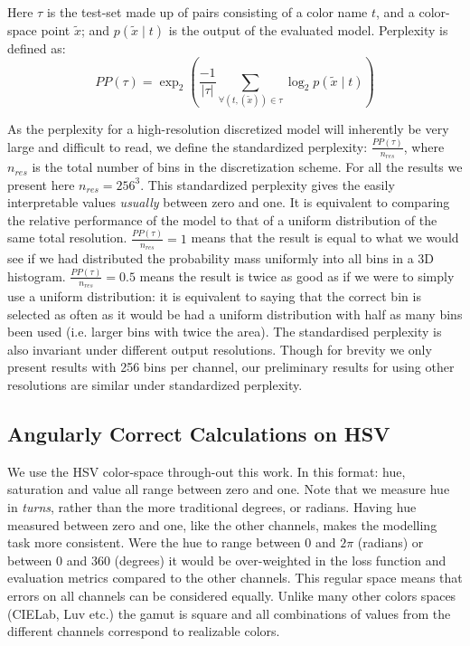 \documentclass[]{book}
\newcommand{\parencite}{\citep}
\begin{document}
Here $\tau$ is the test-set made up of pairs consisting of a color name $t$, and a color-space point $\tilde{x}$;
and  $p(\tilde{x}\mid t)$ is the output of the evaluated model.
Perplexity is defined as:
\begin{equation}
PP(\tau) = \exp_2{\left(
	\frac{-1}{|\tau|} 
	\sum_{
		\forall(t,(\tilde{x})) \in \tau}
	\log_2 p(\tilde{x}\mid t)\right)}
\end{equation}

As the perplexity for a high-resolution discretized model will inherently be very large and difficult to read,
we define the standardized perplexity: $\frac{PP(\tau)}{n_{res}}$,
where $n_{res}$ is the total number of bins in the discretization scheme.
For all the results we present here $n_{res} = 256^3$.
This standardized perplexity gives the easily interpretable values \emph{usually} between zero and one.
It is equivalent to comparing the relative performance of the model to that of a uniform distribution of the same total resolution.
$\frac{PP(\tau)}{n_{res}}=1$ means that the result is equal to what we would see if we had distributed the probability mass uniformly into all bins in a 3D histogram.
$\frac{PP(\tau)}{n_{res}}=0.5$ means the result is twice as good as if we were to simply use a uniform distribution: it is equivalent to saying that the correct bin is selected as often as it would be had a uniform distribution with half as many bins been used (i.e. larger bins with twice the area).
The standardised perplexity is also invariant under different output resolutions.
Though for brevity we only  present results with 256 bins per channel, our preliminary results for using other resolutions are similar under standardized perplexity.


\subsection{Angularly Correct Calculations on HSV}\label{sec:angularly-correct}
We use the HSV color-space \parencite{smith1978color} through-out this work.
In this format: hue, saturation and value all range between zero and one.
Note that we measure hue in \emph{turns}, rather than the more traditional degrees, or radians.
Having hue measured between zero and one, like the other channels, makes the modelling task more consistent.
Were the hue to range between $0$ and $2\pi$ (radians) or between $0$ and $360$ (degrees) it would be over-weighted in the loss function and evaluation metrics compared to the other channels.
This regular space means that errors on all channels can be considered equally.
Unlike many other colors spaces (CIELab, Luv etc.) the gamut is square and all combinations of values from the different channels correspond to realizable colors.
\end{document}

